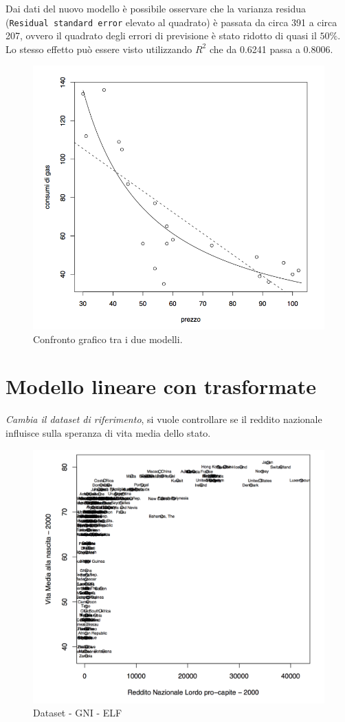 Dai dati del nuovo modello è possibile osservare che la varianza residua (\texttt{Residual standard error} elevato al quadrato) è passata da circa 391 a circa 207, ovvero il quadrato degli errori di previsione è stato ridotto di quasi il $ 50\% $.
Lo stesso effetto può essere visto utilizzando $ R^2 $ che da 0.6241 passa a 0.8006.

\begin{figure}[htbp]
	\centering
	\includegraphics[width=.6\textwidth]{./notes/immagini/l7-fig4.png}
	\caption{Confronto grafico tra i due modelli.}
\end{figure}

\FloatBarrier
\section{Modello lineare con trasformate}\label{modello-lineare-con-trasformate}

\textit{Cambia il dataset di riferimento}, si vuole controllare se il reddito nazionale influisce sulla speranza di vita media dello stato. 

\begin{figure}[htbp]
	\centering
	\includegraphics[width=.7\textwidth]{./notes/immagini/l7-fig5.png}
	\caption{Dataset - GNI - ELF}
\end{figure}

